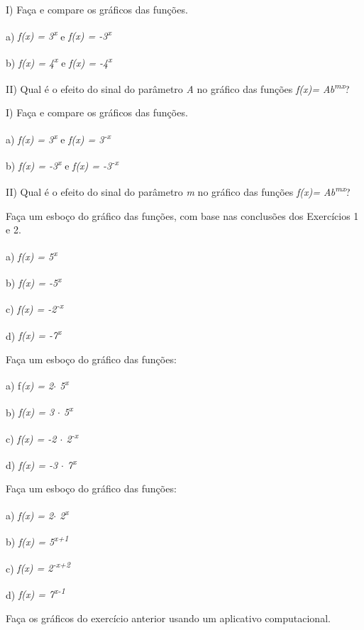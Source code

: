 \begin{exercicios}
\exitem{} I) Faça e compare os gráficos das funções.  

 a) \textit{f(x) = 3\textsuperscript{x}} e \textit{ f(x) = -3\textsuperscript{x}}

 b) \textit{f(x) = 4\textsuperscript{x}} e \textit{f(x) = -4\textsuperscript{x}}

II) Qual é o efeito do sinal do parâmetro \textit{A} no gráfico das funções \textit{f(x)= Ab\textsuperscript{mx}}?

\exitem{} I) Faça e compare os gráficos das funções. 

  a) \textit{f(x) = 3\textsuperscript{x}}  e \textit{f(x) = 3\textsuperscript{-x  }}
  
  b) \textit{f(x) = -3\textsuperscript{x}}\textsuperscript{ }e  \textit{f(x) = -3\textsuperscript{-x}}

 II) Qual é o efeito do sinal do parâmetro \textit{m} no gráfico das funções \textit{f(x)= Ab\textsuperscript{mx}}?

\exitem{} Faça um esboço do gráfico das funções, com base nas conclusões dos Exercícios 1 e 2.

    a) \textit{f(x) = 5\textsuperscript{x}}
    
    b) \textit{f(x) = -5\textsuperscript{x}}
    
    c) \textit{f(x) = -2\textsuperscript{-x }}
    
    d) \textit{f(x) = -7\textsuperscript{x}}

\exitem{} Faça um esboço do gráfico das funções:

a) f\textit{(x) = 2$ \cdot $ 5\textsuperscript{x}}

b) \textit{f(x) = 3 $ \cdot $  5\textsuperscript{x}}

c) \textit{f(x) = -2 $ \cdot $  2\textsuperscript{-x}}

d) \textit{f(x) = -3 $ \cdot $  7\textsuperscript{x}}

\exitem{} Faça um esboço do gráfico das funções:

a) \textit{f(x) = 2$ \cdot $ 2\textsuperscript{x}}

b) \textit{f(x) = 5\textsuperscript{x+1}}

c) \textit{f(x) = 2\textsuperscript{-x+2}}

d) \textit{f(x) = 7\textsuperscript{x-1}}

\item Faça os gráficos do exercício anterior usando um aplicativo computacional.


\end{exercicios}
